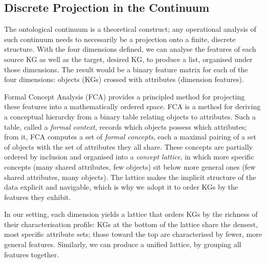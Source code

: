 \documentclass[runningheads]{llncs}
\newenvironment{onlyextended}{\ignorespaces}{\ignorespacesafterend}
\begin{document}
\begin{onlyextended}
\subsection{Discrete Projection in the Continuum}
The ontological continuum is a theoretical construct; any operational analysis of such continuum needs to necessarily be a projection onto a finite, discrete structure. 
With the four dimensions defined, we can analyse the features of each source KG as well as the target, desired KG, to produce a list, organised under those dimensions.
The result would be a binary feature matrix for each of the four dimensions: objects (KGs) crossed with attributes (dimension features). 

Formal Concept Analysis (FCA) \cite{ganter1999formal} provides a principled method for projecting these features into a mathematically ordered space.
FCA is a 
method for deriving a conceptual hierarchy from a binary table relating 
objects to attributes. 
Such a table, called a \emph{formal context}, 
records which objects possess which attributes; from it, FCA computes a 
set of \emph{formal concepts}, each a maximal pairing of a set of objects 
with the set of attributes they all share. These concepts are partially 
ordered by inclusion and organised into a \emph{concept lattice}, in which 
more specific concepts (many shared attributes, few objects) sit below 
more general ones (few shared attributes, many objects). The lattice makes 
the implicit structure of the data explicit and navigable, which is why we 
adopt it to order KGs by the features they exhibit.

In our setting, each dimension yields a lattice that orders KGs by the richness of their characterisation profile: KGs at the bottom of the lattice share the densest, most specific attribute sets; those toward the top are characterised by fewer, more general features. 
Similarly, we can produce a unified lattice, by grouping all features together.

\end{onlyextended}
\end{document}
